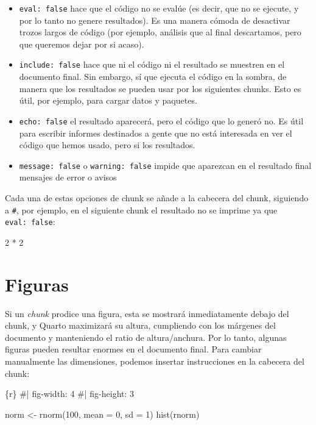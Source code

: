 \documentclass[
  letterpaper,
  DIV=11,
  numbers=noendperiod]{scrreprt}
\newenvironment{Shaded}{\begin{snugshade}}{\end{snugshade}}
\newcommand{\AttributeTok}[1]{\textcolor[rgb]{0.40,0.45,0.13}{#1}}
\newcommand{\CommentTok}[1]{\textcolor[rgb]{0.37,0.37,0.37}{#1}}
\newcommand{\DecValTok}[1]{\textcolor[rgb]{0.68,0.00,0.00}{#1}}
\newcommand{\FunctionTok}[1]{\textcolor[rgb]{0.28,0.35,0.67}{#1}}
\newcommand{\InformationTok}[1]{\textcolor[rgb]{0.37,0.37,0.37}{#1}}
\newcommand{\NormalTok}[1]{\textcolor[rgb]{0.00,0.23,0.31}{#1}}
\newcommand{\OtherTok}[1]{\textcolor[rgb]{0.00,0.23,0.31}{#1}}
\newcommand{\SpecialCharTok}[1]{\textcolor[rgb]{0.37,0.37,0.37}{#1}}
\begin{document}
\begin{itemize}
\item
  \texttt{eval:\ false} hace que el código no se evalúe (es decir, que
  no se ejecute, y por lo tanto no genere resultados). Es una manera
  cómoda de desactivar trozos largos de código (por ejemplo, análisis
  que al final descartamos, pero que queremos dejar por si acaso).
\item
  \texttt{include:\ false} hace que ni el código ni el resultado se
  muestren en el documento final. Sin embargo, sí que ejecuta el código
  en la sombra, de manera que los resultados se pueden usar por los
  siguientes chunks. Esto es útil, por ejemplo, para cargar datos y
  paquetes.
\item
  \texttt{echo:\ false} el resultado aparecerá, pero el código que lo
  generó no. Es útil para escribir informes destinados a gente que no
  está interesada en ver el código que hemos usado, pero si los
  resultados.
\item
  \texttt{message:\ false} o \texttt{warning:\ false} impide que
  aparezcan en el resultado final mensajes de error o avisos
\end{itemize}

Cada una de estas opciones de chunk se añade a la cabecera del chunk,
siguiendo a \texttt{\#\textbar{}}, por ejemplo, en el siguiente chunk el
resultado no se imprime ya que \texttt{eval:\ false}:

\begin{Shaded}
\begin{Highlighting}[]
\DecValTok{2} \SpecialCharTok{*} \DecValTok{2}
\end{Highlighting}
\end{Shaded}

\hypertarget{figuras}{%
\section{Figuras}\label{figuras}}

Si un \emph{chunk} prodice una figura, esta se mostrará inmediatamente
debajo del chunk, y Quarto maximizará su altura, cumpliendo con los
márgenes del documento y manteniendo el ratio de altura/anchura. Por lo
tanto, algunas figuras pueden resultar enormes en el documento final.
Para cambiar manualmente las dimensiones, podemos insertar instrucciones
en la cabecera del chunk:

\begin{Shaded}
\begin{Highlighting}[]
\InformationTok{\textasciigrave{}\textasciigrave{}\textasciigrave{}\{r\}}
\CommentTok{\#|  fig{-}width: 4}
\CommentTok{\#|  fig{-}height: 3}

\NormalTok{norm }\OtherTok{\textless{}{-}} \FunctionTok{rnorm}\NormalTok{(}\DecValTok{100}\NormalTok{, }\AttributeTok{mean =} \DecValTok{0}\NormalTok{, }\AttributeTok{sd =} \DecValTok{1}\NormalTok{)}
\FunctionTok{hist}\NormalTok{(rnorm)}
\InformationTok{\textasciigrave{}\textasciigrave{}\textasciigrave{}}
\end{Highlighting}
\end{Shaded}
\end{document}
